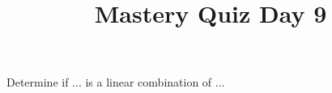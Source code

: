 \documentclass{sbgLAquiz}
\title{Mastery Quiz Day 9 }
\begin{document}
\begin{problem}[V2]
Determine if ... is a linear combination of ...
\end{problem}
\end{document}
